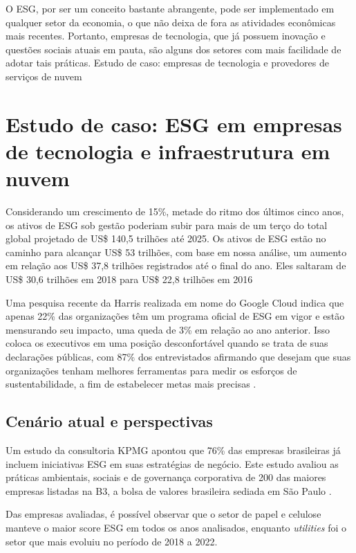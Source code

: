 \documentclass[12pt]{article}
\begin{document}
	O ESG, por ser um conceito bastante abrangente, pode ser implementado em qualquer setor da economia, o que não deixa de fora as atividades econômicas mais recentes. Portanto, empresas de tecnologia, que já possuem inovação e questões sociais atuais em pauta, são alguns dos setores com mais facilidade de adotar tais práticas.
	Estudo de caso: empresas de tecnologia e provedores de serviços de nuvem
	
	\section*{Estudo de caso: ESG em empresas de tecnologia e infraestrutura em nuvem}
	
	Considerando um crescimento de 15\%, metade do ritmo dos últimos cinco anos, os ativos de ESG sob gestão poderiam subir para mais de um terço do total global projetado de US\$ 140,5 trilhões até 2025. Os ativos de ESG estão no caminho para alcançar US\$ 53 trilhões, com base em nossa análise, um aumento em relação aos US\$ 37,8 trilhões registrados até o final do ano. Eles saltaram de US\$ 30,6 trilhões em 2018 para US\$ 22,8 trilhões em 2016 \cite{bloombergprofessionalservicesESGAssetsMay2021}
	
	Uma pesquisa recente da Harris realizada em nome do Google Cloud indica que apenas 22\% das organizações têm um programa oficial de ESG em vigor e estão mensurando seu impacto, uma queda de 3\% em relação ao ano anterior. Isso coloca os executivos em uma posição desconfortável quando se trata de suas declarações públicas, com 87\% dos entrevistados afirmando que desejam que suas organizações tenham melhores ferramentas para medir os esforços de sustentabilidade, a fim de estabelecer metas mais precisas \cite{googlecloudUnderstandingHowYour2023}.
	
	\subsection*{Cenário atual e perspectivas}
	
	Um estudo da consultoria KPMG apontou que 76\% das empresas brasileiras já incluem iniciativas ESG em suas estratégias de negócio. Este estudo avaliou as práticas ambientais, sociais e de governança corporativa de 200 das maiores empresas listadas na B3, a bolsa de valores brasileira sediada em São Paulo \cite{kpmgKPMGESGYearbook2023}.
	
	Das empresas avaliadas, é possível observar que o setor de papel e celulose manteve o maior score ESG em todos os anos analisados, enquanto \emph{utilities} foi o setor que mais evoluiu no período de 2018 a 2022.
	
\end{document}
